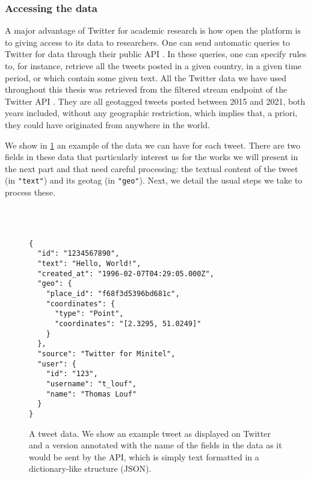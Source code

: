\documentclass[../thesis.tex]{subfiles}
\begin{document}
\subsubsection{Accessing the data}
A major advantage of Twitter for academic research is how open the platform is to giving
access to its data to researchers. One can send automatic queries to Twitter for data
through their public \ac{API} \cite{TwitterAPI}. In these queries, one can specify rules
to, for instance, retrieve all the tweets posted in a given country, in a given time
period, or which contain some given text. All the Twitter data we have used throughout
this thesis was retrieved from the filtered stream endpoint of the Twitter \ac{API}
\cite{TwitterAPIa}. They are all geotagged tweets posted between 2015 and 2021, both
years included, without any geographic restriction, which implies that, a priori, they
could have originated from anywhere in the world.

We show in \cref{fig:tweet_data} an example of the data we can have for each tweet.
There are two fields in these data that particularly interest us for the works we will
present in the next part and that need careful processing: the textual content of the
tweet (in \texttt{"text"}) and its geotag (in \texttt{"geo"}). Next, we detail the usual
steps we take to process these. 
\captionsetup[subfigure]{position=top,textfont=normalfont,singlelinecheck=off,justification=raggedright}
\begin{figure}
  \centering
  \\
  \\
  \begin{SubFloat}{\label{subfig:json}}
    \begin{minipage}[b]{0.95\linewidth}
        \begin{lstlisting}[frame=single,xleftmargin=5mm]
{
  "id": "1234567890",
  "text": "Hello, World!",
  "created_at": "1996-02-07T04:29:05.000Z",
  "geo": {
    "place_id": "f68f3d5396bd681c",
    "coordinates": {
      "type": "Point",
      "coordinates": "[2.3295, 51.0249]"
    }
  },
  "source": "Twitter for Minitel",
  "user": {
    "id": "123",
    "username": "t_louf",
    "name": "Thomas Louf"
  }
}
      \end{lstlisting}
    \end{minipage}
  \end{SubFloat}
  \caption[]{A tweet data. We show  an example tweet as displayed
  on Twitter and  a version annotated with the name of the
  fields in  the data as it would be sent by the \ac{API}, which is
  simply text formatted in a dictionary-like structure (JSON).}
  \label{fig:tweet_data}
\end{figure}
\end{document}
